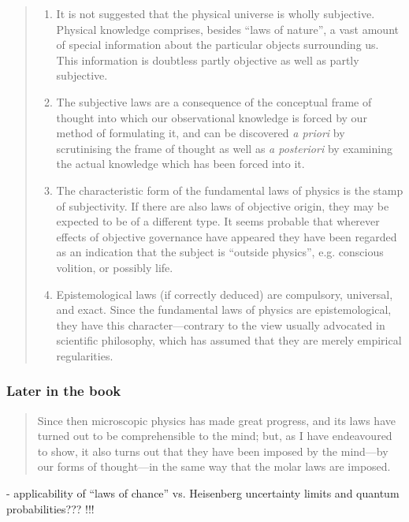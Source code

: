 \begin{quote}
\begin{enumerate}
        \item It is not suggested that the physical universe is wholly subjective.  Physical knowledge comprises, besides ``laws of nature'', a vast amount of special information about the particular objects surrounding us.  This information is doubtless partly objective as well as partly subjective.
        \item The subjective laws are a consequence of the conceptual frame of thought into which our observational knowledge is forced by our method of formulating it, and can be discovered \emph{a priori} by scrutinising the frame of thought as well as \emph{a posteriori} by examining the actual knowledge which has been forced into it.
        \item The characteristic form of the fundamental laws of physics is the stamp of subjectivity.  If there are also laws of objective origin, they may be expected to be of a different type.  It seems probable that wherever effects of objective governance have appeared they have been regarded as an indication that the subject is ``outside physics'', e.g. conscious volition, or possibly life.
        \item Epistemological laws (if correctly deduced) are compulsory, universal, and exact.  Since the fundamental laws of physics are epistemological, they have this character---contrary to the view usually advocated in scientific philosophy, which has assumed that they are merely empirical regularities.\citep[p. 102-105]{Eddington1939}
    \end{enumerate}
\end{quote}

\subsubsection{Later in the book}

\begin{quote}
    Since then microscopic physics has made great progress, and its laws have turned out to be comprehensible to the mind; but, as I have endeavoured to show, it also turns out that they have been imposed by the mind---by our forms of thought---in the same way that the molar laws are imposed. \citep[p. 180]{Eddington1939}
\end{quote}



- applicability of ``laws of chance'' vs. Heisenberg uncertainty limits and quantum probabilities??? !!!

